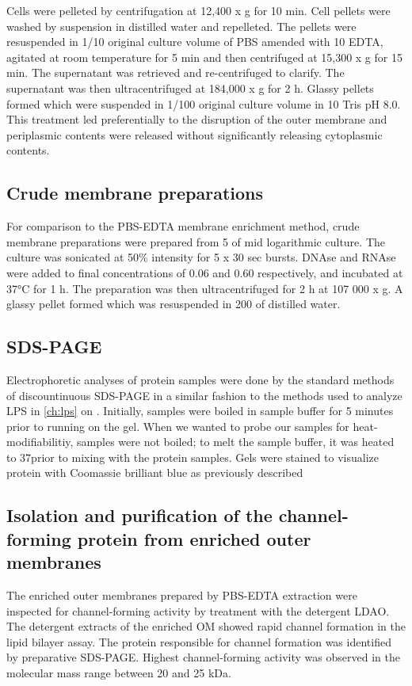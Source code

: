 Cells were pelleted by centrifugation at 12,400 x g for 10 min. Cell pellets were washed by suspension in distilled water and repelleted. The pellets were resuspended in 1/10 original culture volume of \ac{PBS} amended with 10 \millimolar{} \ac{EDTA}, agitated at room temperature for 5 min and then centrifuged at 15,300 x g for 15 min. The supernatant was retrieved and re-centrifuged to clarify. The supernatant was then ultracentrifuged at 184,000 x g for 2 h. Glassy pellets formed which were suspended in 1/100 original culture volume in 10 \millimolar Tris pH 8.0. This treatment led preferentially to the disruption of the outer membrane and periplasmic contents were released without significantly releasing cytoplasmic contents.

\subsection{Crude membrane preparations}
    \label{sub:porin_crude_preps}
    For comparison to the \ac{PBS}-\ac{EDTA} membrane enrichment method, crude membrane preparations were prepared from 5 \millilitre of mid logarithmic culture. The culture was sonicated at 50\% intensity for 5 x 30 sec bursts. DNAse and RNAse were added to final concentrations of 0.06 \mgperml and 0.60 \mgperml respectively, and incubated at 37\si{\degreeCelsius} for 1 h. The preparation was then ultracentrifuged for 2 h at 107 000 x g. A glassy pellet formed which was resuspended in 200 \microlitre of distilled water.

\subsection{\Acl{SDS-PAGE}} \label{sec:porin-sds-page}
Electrophoretic analyses of protein samples were done by the standard methods of discountinuous \ac{SDS-PAGE} in a similar fashion to the methods used to analyze \ac{LPS} in \cref{ch:lps} on . Initially, samples were boiled in sample buffer for 5 minutes prior to running on the gel. When we wanted to probe our samples for heat-modifiabilitiy, samples were not boiled; to melt the sample buffer, it was heated to 37\cel prior to mixing with the protein samples. Gels were stained to visualize protein with Coomassie brilliant blue as previously described

\subsection{Isolation and purification of the channel-forming protein from enriched outer membranes}
\label{sub:porin_isolation}
The enriched outer membranes prepared by \ac{PBS}-\ac{EDTA} extraction were inspected for channel-forming activity by treatment with the detergent \ac{LDAO}. The detergent extracts of the enriched OM showed rapid channel formation in the lipid bilayer assay. The protein responsible for channel formation was identified by preparative \ac{SDS-PAGE}. Highest channel-forming activity was observed in the molecular mass range between 20 and 25 kDa.

